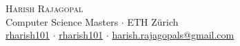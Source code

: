 \newcommand{\sep}{$\cdot$}%
\newcommand{\gmail}{harish.rajagopals@gmail.com}

\begin{center}

\color{headings}
\textsc{\huge Harish Rajagopal}\\[2mm]
Computer Science Masters \sep{} ETH Zürich\\[1mm]
\faGithub{} \href{https://github.com/rharish101}{rharish101} \sep{}
\faLinkedin{} \href{https://www.linkedin.com/in/rharish101/}{rharish101} \sep{}
\faEnvelope{} \href{mailto:\gmail}{\gmail}

\end{center}
